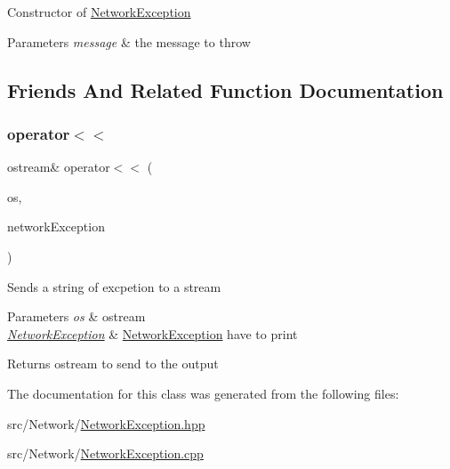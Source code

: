 Constructor of \hyperlink{class_network_exception}{Network\+Exception} 
\begin{DoxyParams}{Parameters}
{\em message} & the message to throw \\
\hline
\end{DoxyParams}


\subsection{Friends And Related Function Documentation}
\hypertarget{class_network_exception_a2c376f88177b93b2c3734294358fbef0}{}\label{class_network_exception_a2c376f88177b93b2c3734294358fbef0} 
\subsubsection{\texorpdfstring{operator$<$$<$}{operator<<}}
{\footnotesize\ttfamily ostream\& operator$<$$<$ (\begin{DoxyParamCaption}\item[{ostream \&}]{os,  }\item[{const \hyperlink{class_network_exception}{Network\+Exception} \&}]{network\+Exception }\end{DoxyParamCaption})\hspace{0.3cm}{\ttfamily [friend]}}

Sends a string of excpetion to a stream 
\begin{DoxyParams}{Parameters}
{\em os} & ostream \\
\hline
{\em \hyperlink{class_network_exception}{Network\+Exception}} & \hyperlink{class_network_exception}{Network\+Exception} have to print \\
\hline
\end{DoxyParams}
\begin{DoxyReturn}{Returns}
ostream to send to the output 
\end{DoxyReturn}


The documentation for this class was generated from the following files\+:\begin{DoxyCompactItemize}
\item 
src/\+Network/\hyperlink{_network_exception_8hpp}{Network\+Exception.\+hpp}\item 
src/\+Network/\hyperlink{_network_exception_8cpp}{Network\+Exception.\+cpp}\end{DoxyCompactItemize}
